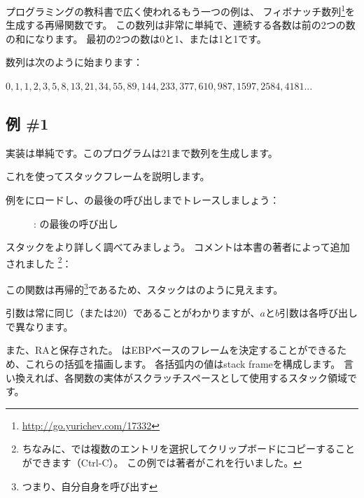 
プログラミングの教科書で広く使われるもう一つの例は、
フィボナッチ数列\footnote{\url{http://go.yurichev.com/17332}}を生成する再帰関数です。
この数列は非常に単純で、連続する各数は前の2つの数の和になります。
最初の2つの数は0と1、または1と1です。

数列は次のように始まります：

\begin{center}
$0, 1, 1, 2, 3, 5, 8, 13, 21, 34, 55, 89, 144, 233, 377, 610, 987, 1597, 2584, 4181 ...$
\end{center}

\subsection{例 \#1}

実装は単純です。このプログラムは21まで数列を生成します。





これを使ってスタックフレームを説明します。

\clearpage

例を\olly にロードし、\ttf{}の最後の呼び出しまでトレースしましょう：

\begin{figure}[H]
\centering
{}
\caption{\olly: \ttf{}の最後の呼び出し}
\label{fig:fib_olly}
\end{figure}

\clearpage
スタックをより詳しく調べてみましょう。
コメントは本書の著者によって追加されました
\footnote{ちなみに、\olly では複数のエントリを選択してクリップボードにコピーすることができます（Ctrl-C）。
この例では著者がこれを行いました。}：



この関数は再帰的\footnote{つまり、自分自身を呼び出す}であるため、スタックはのように見えます。

引数は常に同じ（または20）であることがわかりますが、$a$と$b$引数は各呼び出しで異なります。

また、\ac{RA}と保存された。
\olly はEBPベースのフレームを決定することができるため、これらの括弧を描画します。
各括弧内の値は\gls{stack frame}を構成します。
言い換えれば、各関数の実体がスクラッチスペースとして使用するスタック領域です。

